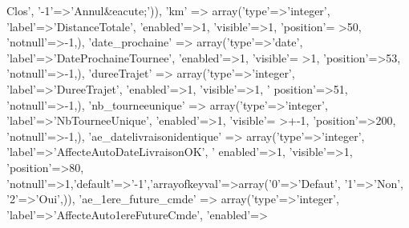\begin{DoxyCode}
{      Clos'}, \textcolor{stringliteral}{'-1'}=>\textcolor{stringliteral}{'Annul&eacute;'})),
        \textcolor{stringliteral}{'km'} => array(\textcolor{stringliteral}{'type'}=>\textcolor{stringliteral}{'integer'}, \textcolor{stringliteral}{'label'}=>\textcolor{stringliteral}{'DistanceTotale'}, \textcolor{stringliteral}{'enabled'}=>1, \textcolor{stringliteral}{'visible'}=>1, \textcolor{stringliteral}{'position'}=
      >50, \textcolor{stringliteral}{'notnull'}=>-1,),
        \textcolor{stringliteral}{'date\_prochaine'} => array(\textcolor{stringliteral}{'type'}=>\textcolor{stringliteral}{'date'}, \textcolor{stringliteral}{'label'}=>\textcolor{stringliteral}{'DateProchaineTournee'}, \textcolor{stringliteral}{'enabled'}=>1, \textcolor{stringliteral}{'visible'}=
      >1, \textcolor{stringliteral}{'position'}=>53, \textcolor{stringliteral}{'notnull'}=>-1,),
        \textcolor{stringliteral}{'dureeTrajet'} => array(\textcolor{stringliteral}{'type'}=>\textcolor{stringliteral}{'integer'}, \textcolor{stringliteral}{'label'}=>\textcolor{stringliteral}{'DureeTrajet'}, \textcolor{stringliteral}{'enabled'}=>1, \textcolor{stringliteral}{'visible'}=>1, \textcolor{stringliteral}{'
      position'}=>51, \textcolor{stringliteral}{'notnull'}=>-1,),
        \textcolor{stringliteral}{'nb\_tourneeunique'} => array(\textcolor{stringliteral}{'type'}=>\textcolor{stringliteral}{'integer'}, \textcolor{stringliteral}{'label'}=>\textcolor{stringliteral}{'NbTourneeUnique'}, \textcolor{stringliteral}{'enabled'}=>1, \textcolor{stringliteral}{'visible'}=
      >+-1, \textcolor{stringliteral}{'position'}=>200, \textcolor{stringliteral}{'notnull'}=>-1,),
        \textcolor{stringliteral}{'ae\_datelivraisonidentique'} => array(\textcolor{stringliteral}{'type'}=>\textcolor{stringliteral}{'integer'}, \textcolor{stringliteral}{'label'}=>\textcolor{stringliteral}{'AffecteAutoDateLivraisonOK'}, \textcolor{stringliteral}{'
      enabled'}=>1, \textcolor{stringliteral}{'visible'}=>1, \textcolor{stringliteral}{'position'}=>80, \textcolor{stringliteral}{'notnull'}=>1,\textcolor{stringliteral}{'default'}=>\textcolor{stringliteral}{'-1'},\textcolor{stringliteral}{'arrayofkeyval'}=>array(\textcolor{charliteral}{'0'}=>\textcolor{stringliteral}{'Defaut'},\textcolor{charliteral}{
      '1'}=>\textcolor{stringliteral}{'Non'}, \textcolor{charliteral}{'2'}=>\textcolor{stringliteral}{'Oui'},)),
        \textcolor{stringliteral}{'ae\_1ere\_future\_cmde'} => array(\textcolor{stringliteral}{'type'}=>\textcolor{stringliteral}{'integer'}, \textcolor{stringliteral}{'label'}=>\textcolor{stringliteral}{'AffecteAuto1ereFutureCmde'}, \textcolor{stringliteral}{'enabled'}=>

\end{DoxyCode}
